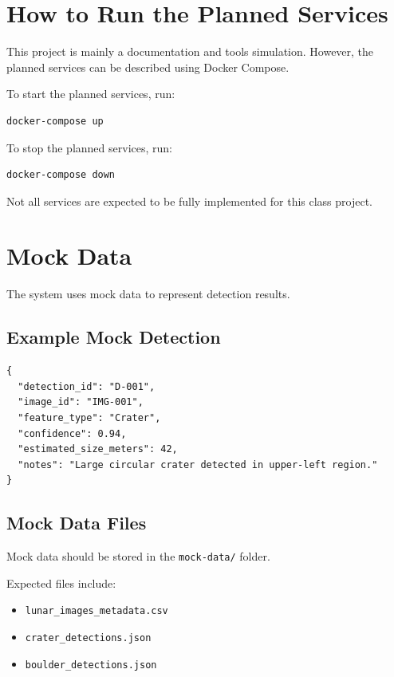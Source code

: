 \documentclass[12pt]{article}
\begin{document}
\section{How to Run the Planned Services}

This project is mainly a documentation and tools simulation. However, the planned services can be described using Docker Compose.

To start the planned services, run:

\begin{verbatim}
docker-compose up
\end{verbatim}

To stop the planned services, run:

\begin{verbatim}
docker-compose down
\end{verbatim}

Not all services are expected to be fully implemented for this class project.

\section{Mock Data}

The system uses mock data to represent detection results.

\subsection{Example Mock Detection}

\begin{verbatim}
{
  "detection_id": "D-001",
  "image_id": "IMG-001",
  "feature_type": "Crater",
  "confidence": 0.94,
  "estimated_size_meters": 42,
  "notes": "Large circular crater detected in upper-left region."
}
\end{verbatim}

\subsection{Mock Data Files}

Mock data should be stored in the \texttt{mock-data/} folder.

Expected files include:

\begin{itemize}
    \item \texttt{lunar\_images\_metadata.csv}
    \item \texttt{crater\_detections.json}
    \item \texttt{boulder\_detections.json}
\end{itemize}
\end{document}
